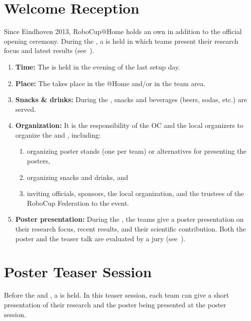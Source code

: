 \section{Welcome Reception}
\label{sec:welcome_reception}
Since Eindhoven 2013, RoboCup@Home holds an own \WelcomeReception{} in addition to the official opening ceremony. During the \WelcomeReception, a \PS{} is held in which teams present their research focus and latest results (see~).
\begin{enumerate}
	\item \textbf{Time:} The \WelcomeReception{} is held in the evening of the last setup day.
	\item \textbf{Place:} The \WelcomeReception{} takes place in the @Home \Arena{} and/or in the \AtHome{} team area.
	\item \textbf{Snacks \& drinks:} During the \WelcomeReception{}, snacks and beverages (beers, sodas, etc.) are served.
	\item \textbf{Organization:} It is the responsibility of the OC and the local organizers to organize the \WelcomeReception{} and \PS{}, including:
		\begin{enumerate}
			\item organizing poster stands (one per team) or alternatives for presenting the posters,
			\item organizing snacks and drinks, and
			\item inviting officials, sponsors, the local organization, and the trustees of the RoboCup Federation to the event.
		\end{enumerate}
	\item \textbf{Poster presentation:} During the \WelcomeReception, the teams give a poster presentation on their research focus, recent results, and their scientific contribution.
	Both the poster and the teaser talk are evaluated by a jury (see~).
\end{enumerate}

\section{Poster Teaser Session}
\label{sec:poster_teaser_session}
Before the \WelcomeReception{} and \PS, a  is held. In this teaser session, each team can give a short presentation of their research and the poster being presented at the poster session.


